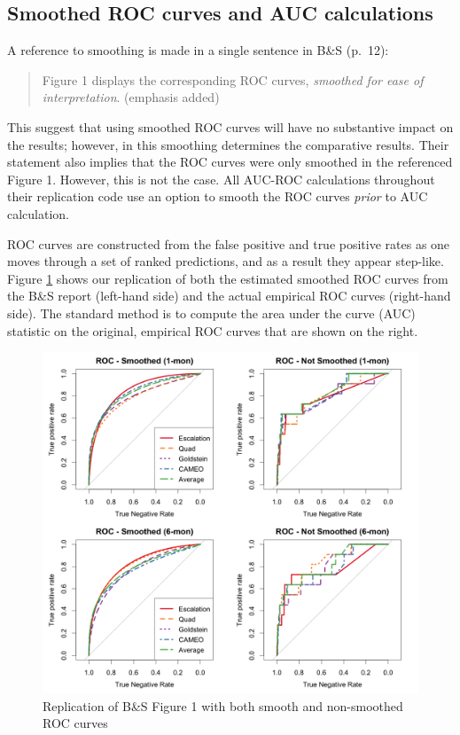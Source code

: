 \documentclass[
]{article}
\begin{document}
\hypertarget{smoothed-roc-curves-and-auc-calculations}{%
\subsection{Smoothed ROC curves and AUC calculations}\label{smoothed-roc-curves-and-auc-calculations}}

A reference to smoothing is made in a single sentence in B\&S (p.~12):

\begin{quote}
Figure 1 displays the corresponding ROC curves, \emph{smoothed for ease of interpretation}. (emphasis added)
\end{quote}

This suggest that using smoothed ROC curves will have no substantive impact on the results; however, in this smoothing determines the comparative results. Their statement also implies that the ROC curves were only smoothed in the referenced Figure 1. However, this is not the case. All AUC-ROC calculations throughout their replication code use an option to smooth the ROC curves \emph{prior} to AUC calculation.

ROC curves are constructed from the false positive and true positive rates as one moves through a set of ranked predictions, and as a result they appear step-like. Figure \ref{fig:rocs} shows our replication of both the estimated smoothed ROC curves from the B\&S report (left-hand side) and the actual empirical ROC curves (right-hand side). The standard method is to compute the area under the curve (AUC) statistic on the original, empirical ROC curves that are shown on the right.

\begin{figure}
\caption{Replication of B\&S Figure 1 with both smooth and non-smoothed ROC curves\label{fig:rocs}}
\centering
\includegraphics[width=.95\linewidth]{figures/fig-1-figure1-replicated.png}
\end{figure}
\end{document}
